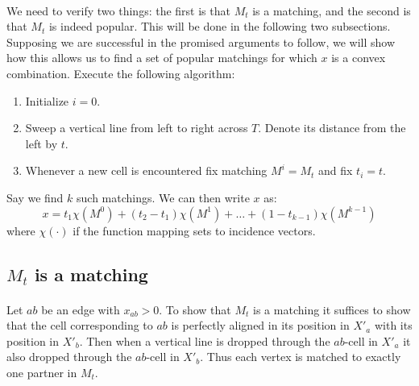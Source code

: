 \documentclass[letterpaper,12pt,oneside,onecolumn]{article}
\begin{document}
\paragraph{}
We need to verify two things: the first is that $M_t$ is a matching, and the second is that $M_t$ is indeed popular. This will be done in the following two subsections. Supposing we are successful in the promised arguments to follow, we will show how this allows us to find a set of popular matchings for which $x$ is a convex combination. Execute the following algorithm:
\begin{enumerate}
\item Initialize $i=0$.
\item Sweep a vertical line from left to right across $T$. Denote its distance from the left by $t$. 
\item Whenever a new cell is encountered fix matching $M^i = M_t$ and fix $t_i = t$. 
\end{enumerate}
Say we find $k$ such matchings. We can then write $x$ as:
$$x = t_1\chi(M^0) + (t_2 - t_1)\chi(M^1) + \dots + (1 - t_{k-1}) \chi(M^{k-1})$$
where $\chi(\cdot)$ if the function mapping sets to incidence vectors.

\subsection{$M_t$ is a matching}
\paragraph{}
Let $ab$ be an edge with $x_{ab} > 0$. To show that $M_t$ is a matching it suffices to show that the cell corresponding to $ab$ is perfectly aligned in its position in $X'_a$ with its position in $X'_b$. Then when a vertical line is dropped through the $ab$-cell in $X'_a$ it also dropped through the $ab$-cell in $X'_b$. Thus each vertex is matched to exactly one partner in $M_t$.
\end{document}
